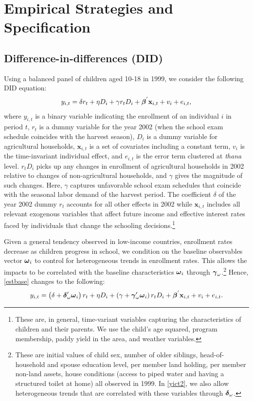 \documentclass[12pt,letterpaper]{article}
\newcommand{\bfbeta}{\ensuremath{\mbox{\boldmath $\beta$}}}
\newcommand{\bfgamma}{\ensuremath{\mbox{\boldmath $\gamma$}}}
\newcommand{\bfdelta}{\ensuremath{\mbox{\boldmath $\delta$}}}
\newcommand{\bfomega}{\ensuremath{\mbox{\boldmath $\omega$}}}
\newcommand{\0}{\ensuremath{\mbox{\boldmath $0$}}}
\begin{document}
\section{Empirical Strategies and Specification}\label{sec_empirical}
\subsection{Difference-in-differences (DID)}

Using a balanced panel of children aged 10-18 in 1999, we consider the following DID equation:
\begin{equation}
y_{i,t} = \delta r_{t} + \eta D_{i} + \gamma r_{t}D_{i} + \bfbeta^{'} \textbf{x}_{i,t} + v_{i} + e_{i,t},
\label{estbase}
\end{equation}
where $y_{i,t}$ is a binary variable indicating the enrollment of an individual $i$ in period $t$, $r_{t}$ is a dummy variable for the year 2002 (when the school exam schedule coincides with the harvest season), $D_{i}$ is a dummy variable for agricultural households, $\textbf{x}_{i,t}$ is a set of covariates including a constant term,  $v_{i}$ is the time-invariant individual effect, and $e_{i,t}$ is the error term clustered at \textit{thana} level. $r_{t}D_{i}$ picks up any changes in enrollment of agricultural households in 2002 relative to changes of non-agricultural households, and $\gamma$ gives the magnitude of such changes. Here, $\gamma$ captures unfavorable school exam schedules that coincide with the seasonal labor demand of the harvest period. The coefficient $\delta$ of the year 2002 dummy $r_{t}$ accounts for all other effects in 2002 while $\textbf{x}_{i,t}$ includes all relevant exogenous variables that affect future income and effective interest rates faced by individuals that change the schooling decisions.\footnote{These are, in general, time-variant variables capturing the characteristics of children and their parents. We use the child's age squared, program membership, paddy yield in the area, and weather variables. }

Given a general tendency observed in low-income countries, enrollment rates decrease as children progress in school, we condition on the baseline observables vector $\bfomega_{i}$ to control for heterogeneous trends in enrollment rates. This allows the impacts to be correlated with the baseline characteristics $\bfomega_{i}$ through $\bfgamma_{\omega}$.\footnote{These are initial values of child sex, number of older siblings, head-of-household and spouse education level, per member land holding, per member non-land assets, house conditions (access to piped water and having a structured toilet at home) all observed in 1999. In \eqref{yict2}, we also allow heterogeneous trends that are correlated with these variables through $\bfdelta_{\omega}$. }
Hence, \eqref{estbase} changes to the following:
\begin{equation}
y_{i,t} = 
\left(\delta +\bfdelta'_{\omega}\bfomega_{i}\right)r_{t} + \eta D_{i} +
\left(\gamma + \bfgamma'_{\omega}\bfomega_{i}\right)r_{t}D_{i} + 
\bfbeta^{'}\textbf{x}_{i,t} + v_{i} + e_{i,t}.
\label{yict2}
\end{equation}
\end{document}
